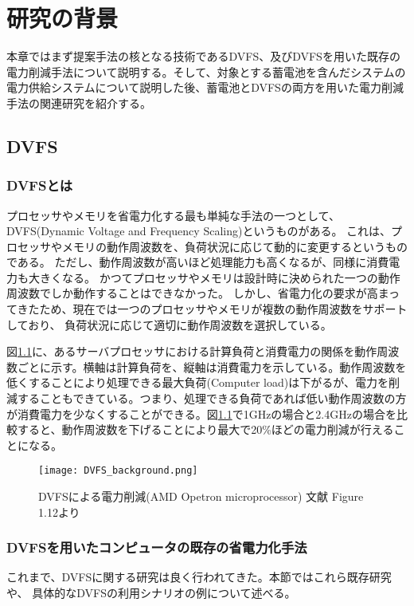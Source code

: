 \chapter{研究の背景}
\label{chap:background}

本章ではまず提案手法の核となる技術であるDVFS、及びDVFSを用いた既存の電力削減手法について説明する。そして、対象とする蓄電池を含んだシステムの電力供給システムについて説明した後、蓄電池とDVFSの両方を用いた電力削減手法の関連研究を紹介する。

\section{DVFS}
\label{sec:dvfs}

\subsection{DVFSとは}
プロセッサやメモリを省電力化する最も単純な手法の一つとして、DVFS(Dynamic Voltage and Frequency Scaling)というものがある。
これは、プロセッサやメモリの動作周波数を、負荷状況に応じて動的に変更するというものである。
ただし、動作周波数が高いほど処理能力も高くなるが、同様に消費電力も大きくなる。
かつてプロセッサやメモリは設計時に決められた一つの動作周波数でしか動作することはできなかった。
しかし、省電力化の要求が高まってきたため、現在では一つのプロセッサやメモリが複数の動作周波数をサポートしており、
負荷状況に応じて適切に動作周波数を選択している。


図\ref{fig:dvfs_background}に、あるサーバプロセッサにおける計算負荷と消費電力の関係を動作周波数ごとに示す\cite{Hennessy:2011:CAF:1999263}。横軸は計算負荷を、縦軸は消費電力を示している。動作周波数を低くすることにより処理できる最大負荷(Computer load)は下がるが、電力を削減することもできている。つまり、処理できる負荷であれば低い動作周波数の方が消費電力を少なくすることができる。図\ref{fig:dvfs_background}で1GHzの場合と2.4GHzの場合を比較すると、動作周波数を下げることにより最大で20\%ほどの電力削減が行えることになる。

\begin{figure}[t]
 \begin{center}
  \texttt{[image: DVFS\_background.png]}
 \end{center}
 \caption{DVFSによる電力削減(AMD Opetron microprocessor) 文献\cite{Hennessy:2011:CAF:1999263} Figure 1.12より}
 \label{fig:dvfs_background}
\end{figure}



\subsection{DVFSを用いたコンピュータの既存の省電力化手法}
これまで、DVFSに関する研究は良く行われてきた。本節ではこれら既存研究や、
具体的なDVFSの利用シナリオの例について述べる。


